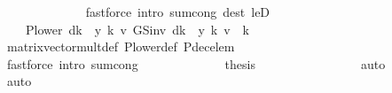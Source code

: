 \begin{isabellebody}
\ \ \ \ \ \ \ \ \ \ \ \ \isamarkupfalse%
\ {\isacharparenleft}{\kern0pt}fastforce\ intro{\isacharbang}{\kern0pt}{\isacharcolon}{\kern0pt}\ sum{\isachardot}{\kern0pt}cong\ dest{\isacharcolon}{\kern0pt}\ leD{\isacharparenright}{\kern0pt}\isanewline
\ \ \ \ \ \ \ \ \ \ \isamarkupfalse%
\ \isamarkupfalse%
\ {\isachardoublequoteopen}{\isasymdots}\ {\isacharequal}{\kern0pt}\ \ {\isacharparenleft}{\kern0pt}P{\isacharunderscore}{\kern0pt}lower\ {\isacharparenleft}{\kern0pt}d{\isacharparenleft}{\kern0pt}k\ {\isacharcolon}{\kern0pt}{\isacharequal}{\kern0pt}\ y\ k{\isacharparenright}{\kern0pt}{\isacharparenright}{\kern0pt}\ {\isacharasterisk}{\kern0pt}v\ GS{\isacharunderscore}{\kern0pt}inv\ {\isacharparenleft}{\kern0pt}d{\isacharparenleft}{\kern0pt}k\ {\isacharcolon}{\kern0pt}{\isacharequal}{\kern0pt}\ y\ k{\isacharparenright}{\kern0pt}{\isacharparenright}{\kern0pt}\ v{\isacharparenright}{\kern0pt}\ {\isachardollar}{\kern0pt}\ k{\isachardoublequoteclose}\isanewline
\ \ \ \ \ \ \ \ \ \ \ \ \isamarkupfalse%
\ matrix{\isacharunderscore}{\kern0pt}vector{\isacharunderscore}{\kern0pt}mult{\isacharunderscore}{\kern0pt}def\ P{\isacharunderscore}{\kern0pt}lower{\isacharunderscore}{\kern0pt}def\ P{\isacharunderscore}{\kern0pt}dec{\isacharunderscore}{\kern0pt}elem\isanewline
\ \ \ \ \ \ \ \ \ \ \ \ \isamarkupfalse%
\ {\isacharparenleft}{\kern0pt}fastforce\ intro{\isacharbang}{\kern0pt}{\isacharcolon}{\kern0pt}\ sum{\isachardot}{\kern0pt}cong{\isacharparenright}{\kern0pt}\isanewline
\ \ \ \ \ \ \ \ \ \ \isamarkupfalse%
\ \isamarkupfalse%
\ {\isacharquery}{\kern0pt}thesis\isacommand{{\isachardot}{\kern0pt}}\isamarkupfalse%
\isanewline
\ \ \ \ \ \ \ \ \isamarkupfalse%
\isanewline
\ \ \ \ \ \ \isamarkupfalse%
\ auto\isanewline
\ \ \ \ \isamarkupfalse%
\ auto\isanewline
\ \ \ \ \isamarkupfalse%
\ \isamarkupfalse%

\end{isabellebody}
